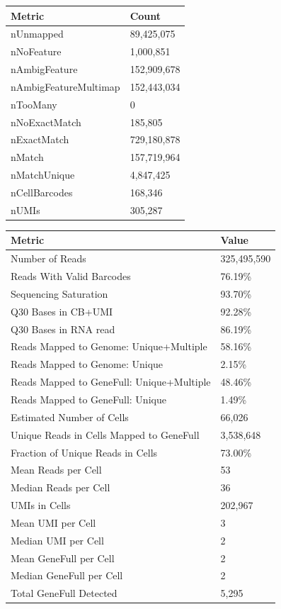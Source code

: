 \documentclass[
  11pt,
  a4paper,
]{report}
\begin{document}
\begin{longtable}[]{@{}ll@{}}
\toprule\noalign{}
Metric & Count \\
\midrule\noalign{}
\endhead
\bottomrule\noalign{}
\endlastfoot
nUnmapped & 89,425,075 \\
nNoFeature & 1,000,851 \\
nAmbigFeature & 152,909,678 \\
nAmbigFeatureMultimap & 152,443,034 \\
nTooMany & 0 \\
nNoExactMatch & 185,805 \\
nExactMatch & 729,180,878 \\
nMatch & 157,719,964 \\
nMatchUnique & 4,847,425 \\
nCellBarcodes & 168,346 \\
nUMIs & 305,287 \\
\end{longtable}

\begin{longtable}[]{@{}ll@{}}
\toprule\noalign{}
Metric & Value \\
\midrule\noalign{}
\endhead
\bottomrule\noalign{}
\endlastfoot
Number of Reads & 325,495,590 \\
Reads With Valid Barcodes & 76.19\% \\
Sequencing Saturation & 93.70\% \\
Q30 Bases in CB+UMI & 92.28\% \\
Q30 Bases in RNA read & 86.19\% \\
Reads Mapped to Genome: Unique+Multiple & 58.16\% \\
Reads Mapped to Genome: Unique & 2.15\% \\
Reads Mapped to GeneFull: Unique+Multiple & 48.46\% \\
Reads Mapped to GeneFull: Unique & 1.49\% \\
Estimated Number of Cells & 66,026 \\
Unique Reads in Cells Mapped to GeneFull & 3,538,648 \\
Fraction of Unique Reads in Cells & 73.00\% \\
Mean Reads per Cell & 53 \\
Median Reads per Cell & 36 \\
UMIs in Cells & 202,967 \\
Mean UMI per Cell & 3 \\
Median UMI per Cell & 2 \\
Mean GeneFull per Cell & 2 \\
Median GeneFull per Cell & 2 \\
Total GeneFull Detected & 5,295 \\
\end{longtable}
\end{document}
